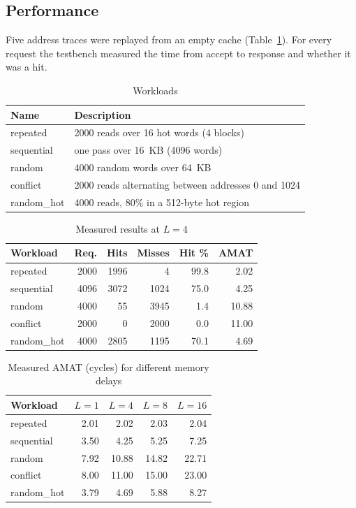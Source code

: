 \documentclass[conference]{IEEEtran}
\begin{document}
\subsection{Performance}
Five address traces were replayed from an empty cache (Table~\ref{tab:workloads}). For every request the testbench measured the time from accept to response and whether it was a hit.

\begin{table}[t]
\caption{Workloads}\label{tab:workloads}
\centering\small
\begin{tabular}{@{}p{}p{}@{}}
\toprule
Name & Description\\
\midrule
repeated & 2000 reads over 16 hot words (4 blocks)\\
sequential & one pass over 16~KB (4096 words)\\
random & 4000 random words over 64~KB\\
conflict & 2000 reads alternating between addresses 0 and 1024\\
random\_hot & 4000 reads, 80\% in a 512-byte hot region\\
\bottomrule
\end{tabular}
\end{table}

\begin{table}[t]
\caption{Measured results at $L=4$}\label{tab:perf}
\centering\small
\begin{tabular}{@{}lrrrrr@{}}
\toprule
Workload & Req. & Hits & Misses & Hit \% & AMAT\\
\midrule
repeated & 2000 & 1996 & 4 & 99.8 & 2.02\\
sequential & 4096 & 3072 & 1024 & 75.0 & 4.25\\
random & 4000 & 55 & 3945 & 1.4 & 10.88\\
conflict & 2000 & 0 & 2000 & 0.0 & 11.00\\
random\_hot & 4000 & 2805 & 1195 & 70.1 & 4.69\\
\bottomrule
\end{tabular}
\end{table}

\begin{table}[t]
\caption{Measured AMAT (cycles) for different memory delays}\label{tab:amat}
\centering\small
\begin{tabular}{@{}lrrrr@{}}
\toprule
Workload & $L=1$ & $L=4$ & $L=8$ & $L=16$\\
\midrule
repeated & 2.01 & 2.02 & 2.03 & 2.04\\
sequential & 3.50 & 4.25 & 5.25 & 7.25\\
random & 7.92 & 10.88 & 14.82 & 22.71\\
conflict & 8.00 & 11.00 & 15.00 & 23.00\\
random\_hot & 3.79 & 4.69 & 5.88 & 8.27\\
\bottomrule
\end{tabular}
\end{table}
\end{document}

